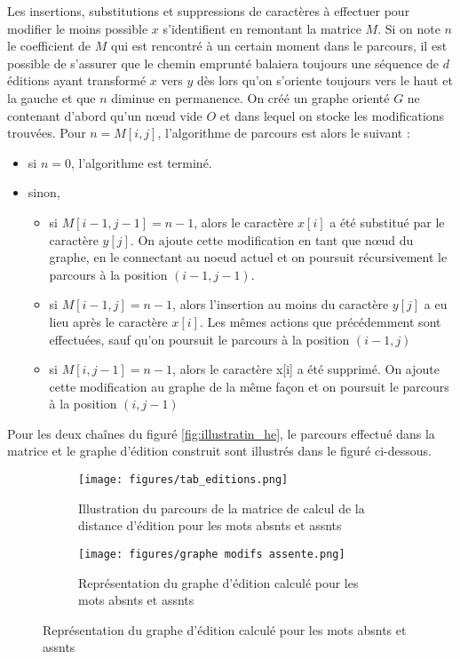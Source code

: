 \documentclass[12pt, twoside]{report}
\begin{document}
Les insertions, substitutions et suppressions de caractères à effectuer pour modifier le moins possible $x$ s'identifient en remontant la matrice $M$. Si on note $n$ le coefficient de $M$ qui est rencontré à un certain moment dans le parcours, il est possible de s'assurer que le chemin emprunté balaiera toujours une séquence de $d$ éditions ayant transformé $x$ vers $y$ dès lors qu'on s'oriente toujours vers \og{} le haut et la gauche \fg{} et que $n$ diminue en permanence. \autocite[chap. 2]{jurafsky} On créé un graphe orienté $G$ ne contenant d'abord qu'un n\oe{}ud vide $O$ et dans lequel on stocke les modifications trouvées. Pour $n=M[i,j]$, l'algorithme de parcours est alors le suivant :
\begin{itemize}
    \item si $n=0$, l'algorithme est terminé.
    \item sinon, \begin{itemize}
        \item si $M[i-1, j-1] = n-1$, alors le caractère $x[i]$ a été substitué par le caractère $y[j]$. On ajoute cette modification en tant que n\oe{}ud du graphe, en le connectant au noeud actuel et on poursuit récursivement le parcours à la position $(i-1, j-1)$.
        \item si $M[i-1, j] = n-1$, alors l'insertion au moins du caractère $y[j]$ a eu lieu après le caractère $x[i]$. Les mêmes actions que précédemment sont effectuées, sauf qu'on poursuit le parcours à la position $(i-1, j)$
        \item si $M[i, j-1] = n-1$, alors le caractère x[i] a été supprimé. On ajoute cette modification au graphe de la même façon et on poursuit le parcours à la position $(i, j-1)$
    \end{itemize}
\end{itemize}
Pour les deux chaînes du figuré \ref{fig:illustratin_he}, le parcours effectué dans la matrice et le graphe d'édition construit sont illustrés dans le figuré ci-dessous.
\begin{figure}[!h]
    \centering
    \begin{subfigure}[b]{0.4\textwidth}
        \texttt{[image: figures/tab\_editions.png]}
        \caption{Illustration du parcours de la matrice de calcul de la distance d'édition pour les mots \og{} abs\textepsilon{}nts\fg{} et \og{} ass\textepsilon{}nts\fg{}}
    \end{subfigure}
    \begin{subfigure}[b]{0.4\textwidth}
        \texttt{[image: figures/graphe modifs assente.png]}
        \caption{Représentation du graphe d'édition calculé pour les mots \og{} abs\textepsilon{}nts\fg{} et \og{} ass\textepsilon{}nts\fg{}}
    \end{subfigure}
    
\end{figure}
\end{document}
